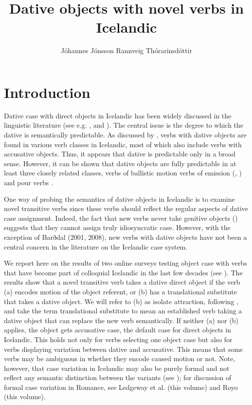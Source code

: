 \documentclass[output=paper,modfonts,nonflat]{langsci/langscibook}
\author{Jóhannes Jónsson\affiliation{Unversity of Iceland}\lastand
Rannveig Thórarinsdóttir\affiliation{Unversity of Iceland}}
\title{Dative objects with novel verbs in Icelandic}
\begin{document}
\maketitle 
 

 

\section{Introduction} %

Dative case with direct objects in Icelandic has been widely discussed in the linguistic literature (see e.g. \citealt{YipEtAl1987,Barðdal2001,Barðdal2008,Svenonius2002,Maling2002}, and \citealt{Jónsson2013a}). The central issue is the degree to which the dative is semantically predictable. As discussed by \citet{Maling2002}, verbs with dative objects are found in various verb classes in Icelandic, most of which also include verbs with accusative objects. Thus, it appears that dative is predictable only in a broad sense. However, it can be shown that dative objects are fully predictable in at least three closely related classes, verbs of ballistic motion \citep{Svenonius2002} verbs of emission (\citealt{Maling2002}, \citealt{Jónsson2013a}) and pour verbs \citep{Jónsson2013a}.

One way of probing the semantics of dative objects in Icelandic is to examine novel transitive verbs since these verbs should reflect the regular aspects of dative case assignment. Indeed, the fact that new verbs never take genitive objects (\citealt{JónssonEythórsson2011}) suggests that they cannot assign truly idiosyncratic case. However, with the exception of Barðdal (2001, 2008), new verbs with dative objects have not been a central concern in the literature on the Icelandic case system. 

We report here on the results of two online surveys testing object case with verbs that have become part of colloquial Icelandic in the last few decades (see \citealt{Thórarinsdóttir2015}). The results show that a novel transitive verb takes a dative direct object if the verb (a) encodes motion of the object referent, or (b) has a translational substitute that takes a dative object. We will refer to (b) as isolate attraction, following \citet{Barðdal2001}, and take the term translational substitute to mean an established verb taking a dative object that can replace the new verb semantically. If neither (a) nor (b) applies, the object gets accusative case, the default case for direct objects in Icelandic. This holds not only for verbs selecting one object case but also for verbs displaying variation between dative and accusative. This means that some verbs may be ambiguous in whether they encode caused motion or not. Note, however, that case variation in Icelandic may also be purely formal and not reflect any semantic distinction between the variants (see \citealt{Jónsson2013b}); for discussion of formal case variation in Romance, see Ledgeway et al. (this volume) and Royo (this volume).
\end{document}

